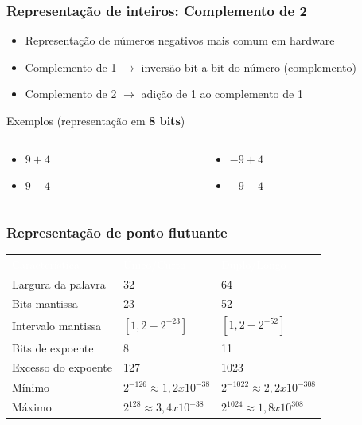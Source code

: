 \documentclass[aspectratio=169,
				xcolor=table]{beamer}
\begin{document}
		\begin{frame}
			\frametitle{Representação de inteiros: Complemento de 2}
			\begin{itemize}
				\item Representação de números negativos mais comum em hardware
				\vspace{0.4em}
				\item Complemento de 1 $\to$ inversão bit a bit do número (complemento)
				\item Complemento de 2 $\to$ adição de 1 ao complemento de 1	
				\vspace{0.3em}
			\end{itemize}
			\begin{exampleblock}{Exemplos (representação em \textbf{8 bits})}
				\begin{columns}
					\begin{column}{0.45\textwidth}
						\begin{itemize}
							\item $9+4$
							\item $9-4$
						\end{itemize}
					\end{column}
					\begin{column}{0.45\textwidth}
						\begin{itemize}
							\item $-9+4$
							\item $-9-4$
						\end{itemize}
					\end{column}
				\end{columns}
			
			\end{exampleblock}
			
		\end{frame}		
		
		\begin{frame}
			\frametitle{Representação de ponto flutuante }
			\begin{eftable}
				\begin{tabular}{l | l | l}
					\textcolor{white}{Característica} &
					\textcolor{white}{Único/Curto} &
					\textcolor{white}{Duplo/Longo} \\
					Largura da palavra & 32 & 64 \\
					Bits mantissa & 23 & 52 \\
					Intervalo mantissa & $[1, 2-2^{-23}]$ & $[1, 2-2^{-52}]$\\
					Bits de expoente & 8 & 11 \\
					Excesso do expoente & 127 & 1023 \\
					Mínimo & $2^{-126} \approx 1,2x10^{-38}$ & $2^{-1022}\approx 2,2x10^{-308}$ \\
					Máximo & $2^{128} \approx 3,4x10^{-38}$ & $2^{1024}\approx 1,8x10^{308}$
				\end{tabular}
			
			\end{eftable}
		\end{frame}
\end{document}
